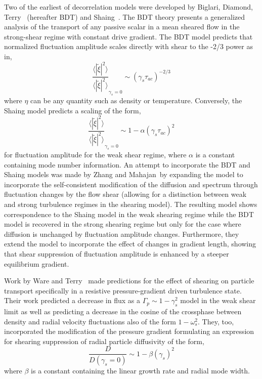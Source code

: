 \documentclass[aip,pop,amsmath,amssymb,preprint,superscriptaddress]{revtex4-1} %
\begin{document}
Two of the earliest of decorrelation models were developed by Biglari, Diamond, Terry~\cite{biglari90} (hereafter BDT) and Shaing~\cite{shaing90}. The BDT theory presents a generalized analysis of the transport of any passive scalar in a mean sheared flow in the strong-shear regime with constant drive gradient. The BDT model predicts that normalized fluctuation amplitude scales directly with shear to the -2/3 power as in,
%
\begin{equation}
\frac{\langle |\tilde{\xi}|^{2} \rangle}{\langle |\tilde{\xi}|^{2} \rangle}_{\gamma_{s}=0} \sim (\gamma_{s}\tau_{ac})^{-2/3}
\label{eq:BDT_theory}
\end{equation}
%
where $\eta$ can be any quantity such as density or temperature. Conversely, the Shaing model predicts a scaling of the form,
%
\begin{equation}
\frac{\langle |\tilde{\xi}|^{2} \rangle}{\langle |\tilde{\xi}|^{2} \rangle}_{\gamma_{s}=0} \sim 1- \alpha(\gamma_{s}\tau_{ac})^2
\label{eq:shaing_theory}
\end{equation}
%
for fluctuation amplitude for the weak shear regime, where $\alpha$ is a constant containing mode number information. An attempt to incorporate the BDT and Shaing models was made by Zhang and Mahajan~\cite{zhang92,zhang93}by expanding the model to incorporate the self-consistent modification of the diffusion and spectrum through fluctuation changes by the flow shear (allowing for a distinction between weak and strong turbulence regimes in the shearing model). The resulting model shows correspondence to the Shaing model in the weak shearing regime while the BDT model is recovered in the strong shearing regime but only for the case where diffusion is unchanged by fluctuation amplitude changes. Furthermore, they extend the model to incorporate the effect of changes in gradient length, showing that shear suppression of fluctuation amplitude is enhanced by a steeper equilibrium gradient. 

Work by Ware and Terry~\cite{ware96,ware98} made predictions for the effect of shearing on particle transport specifically in a resistive pressure-gradient driven turbulence state. Their work predicted a decrease in flux as a $\Gamma_{p} \sim 1-\gamma_{s}^2$ model in the weak shear limit as well as predicting a decrease in the cosine of the crossphase between density and radial velocity fluctuations also of the form $1-\omega_{s}^2$. They, too, incorporated the modification of the pressure gradient formulating an expression for shearing suppression of radial particle diffusivity of the form,
%
\begin{equation}
\frac{D}{D(\gamma_{s}=0)} \sim 1-\beta(\gamma_{s})^2
\label{eq:ware_diff_theory}
\end{equation}
%
where $\beta$ is a constant containing the linear growth rate and radial mode width.
\end{document}
